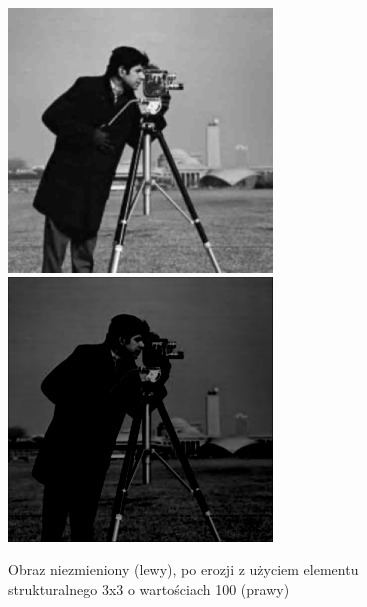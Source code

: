 \documentclass[a4paper,12pt]{book}
\begin{document}
\begin{figure}[H]
	\caption{Obraz niezmieniony (lewy), po erozji z użyciem elementu strukturalnego 3x3 o wartościach 100 (prawy)}
	\includegraphics[width=7cm, height=7cm]{man-unmodified.jpg}
	\includegraphics[width=7cm, height=7cm]{morph-gray-erosion-strel3x3-100.png}
\end{figure}
\end{document}
